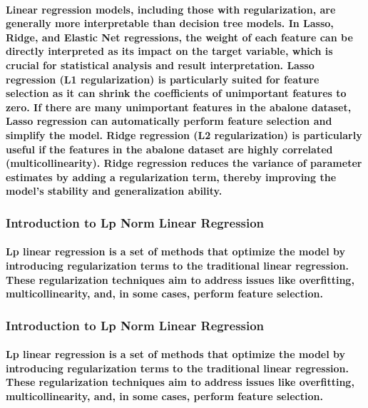 \documentclass[11pt]{article} %
\begin{document}
\paragraph{Linear regression models, including those with regularization, are generally more interpretable than decision tree models. In Lasso, Ridge, and Elastic Net regressions, the weight of each feature can be directly interpreted as its impact on the target variable, which is crucial for statistical analysis and result interpretation. Lasso regression (L1 regularization) is particularly suited for feature selection as it can shrink the coefficients of unimportant features to zero. If there are many unimportant features in the abalone dataset, Lasso regression can automatically perform feature selection and simplify the model. Ridge regression (L2 regularization) is particularly useful if the features in the abalone dataset are highly correlated (multicollinearity). Ridge regression reduces the variance of parameter estimates by adding a regularization term, thereby improving the model's stability and generalization ability.}
\subsubsection{Introduction to Lp Norm Linear Regression}
\paragraph{Lp linear regression is a set of methods that optimize the model by introducing regularization terms to the traditional linear regression. These regularization techniques aim to address issues like overfitting, multicollinearity, and, in some cases, perform feature selection.}
% 
% 
\subsubsection{Introduction to Lp Norm Linear Regression}
\paragraph{Lp linear regression is a set of methods that optimize the model by introducing regularization terms to the traditional linear regression. These regularization techniques aim to address issues like overfitting, multicollinearity, and, in some cases, perform feature selection.}
\end{document}

